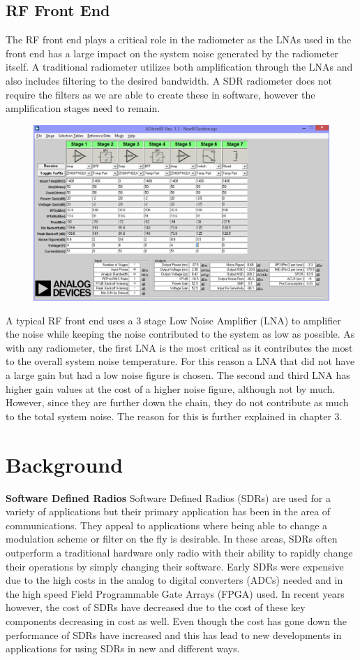 \subsection{RF Front End}
The RF front end plays a critical role in the radiometer as the LNAs used in the front end has a large impact on the system noise generated by the radiometer itself.  A traditional radiometer utilizes both amplification through the LNAs and also includes filtering to the desired bandwidth.  A SDR radiometer does not require the filters as we are able to create these in software, however the amplification stages need to remain.  

{\begin{figure}[h!tb] 
\centering
\includegraphics[width=0.8\linewidth]{Images/RF_Front_end.png}
\label{ISU_Rad}
\end{figure}
}
A typical RF front end uses a 3 stage Low Noise Amplifier (LNA) to amplifier the noise while keeping the noise contributed to the system as low as possible.  As with any radiometer, the first LNA is the most critical as it contributes the most to the overall system noise temperature.  For this reason a LNA that did not have a large gain but had a low noise figure is chosen. The second and third LNA has higher gain values at the cost of a higher noise figure, although not by much.  However, since they are further down the chain, they do not contribute as much to the total system noise.  The reason for this is further explained in chapter 3. 

\section{Background}
\textbf{Software Defined Radios} 
Software Defined Radios (SDRs) are used for a variety of applications but their primary application has been in the area of communications.  They appeal to applications where being able to change a modulation scheme or filter on the fly is desirable.  In these areas, SDRs often outperform a traditional hardware only radio with their ability to rapidly change their operations by simply changing their software.  Early SDRs were expensive due to the high costs in the analog to digital converters (ADCs) needed and in the high speed Field Programmable Gate Arrays (FPGA) used.  In recent years however, the cost of SDRs have decreased due to the cost of these key components decreasing in cost as well.  Even though the cost has gone down the performance of SDRs have increased and this has lead to new developments in applications for using SDRs in new and different ways.

